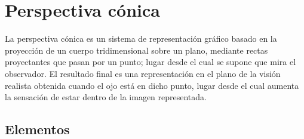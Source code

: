 
\chapter{Perspectiva cónica}

La perspectiva cónica es un sistema de representación gráfico basado en la proyección de un cuerpo tridimensional sobre un plano, mediante rectas proyectantes que pasan por un punto; lugar desde el cual se supone que mira el observador. El resultado final es una representación en el plano de la visión realista obtenida cuando el ojo está en dicho punto, lugar desde el cual aumenta la sensación de estar dentro de la imagen representada.

\section{Elementos}

